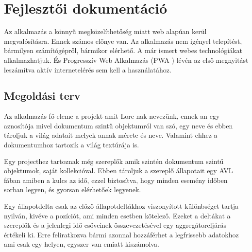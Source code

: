 \chapter{Fejlesztői dokumentáció}
\label{ch:impl}

Az alkalmazás a könnyű megközelíthetőség miatt web alapúan kerül megvalósításra. Ennek számos előnye van. Az alkalmazás nem igényel telepítést, bármilyen számítógépről, bármikor elérhető. A már ismert webes technológiákat alkalmazhatjuk. És Progresszív Web Alkalmazás (PWA \cite{PWA}) lévén az első megnyitást leszámítva aktív internetelérés sem kell a használatához.

\section{Megoldási terv}

Az alkalmazás fő eleme a projekt amit Lore-nak nevezünk, ennek an egy aznosítója mivel dokumentum szintű objektumról van szó, egy neve és ebben tároljuk a világ adatait melyek annak mérete és neve. Valamint ehhez a dokumentumhoz tartozik a világ textúrája is.

Egy projecthez tartoznak még szereplők amik szintén dokumentum szintű objektumok, saját kollekcióval. Ebben tároljuk a szereplő állapotait egy AVL fában \cite{AVL} amiben a kulcs az idő, ezzel biztosítva, hogy minden esemény időben sorban legyen, és gyorsan elérhetőek legyenek.

Egy állapotdelta csak az előző állapotdeltákhoz viszonyított különbséget tartja nyilván, kivéve a pozíciót, ami minden esetben kötelező. Ezeket a deltákat a szereplők és a jelenlegi idő csöveinek összevezetésével egy aggregátoreljárás értékeli ki. Erre feliratkozva bármi azonnal hozzáférhet a legfrissebb adatokhoz ami csak egy helyen, egyszer van emiatt kiszámolva.

